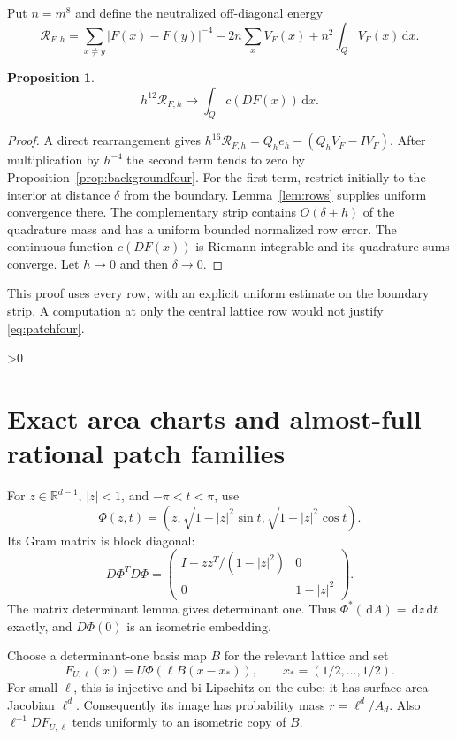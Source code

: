 \documentclass[11pt,a4paper]{article}
\newtheorem{proposition}[theorem]{Proposition}
\theoremstyle{definition}
\newcommand{\R}{\mathbb R}
\newcommand{\dd}{\,\mathrm d}
\newcommand{\abs}[1]{\lvert#1\rvert}
\numberwithin{equation}{section}
\let\originalsection\section
\renewcommand{\section}{\ifnum\value{section}>0\clearpage\fi\originalsection}
\begin{document}
Put $n=m^8$ and define the neutralized off-diagonal energy
\begin{equation}
 \mathscr R_{F,h}=\sum_{x\ne y}\abs{F(x)-F(y)}^{-4}
                   -2n\sum_xV_F(x)+n^2\int_QV_F(x)\dd x.
\end{equation}
\begin{proposition}\label{prop:patchfour}
\begin{equation}\label{eq:patchfour}
 h^{12}\mathscr R_{F,h}\longrightarrow\int_Qc(DF(x))\dd x.
\end{equation}
\end{proposition}
\begin{proof}
A direct rearrangement gives
$h^{16}\mathscr R_{F,h}=Q_he_h-(Q_hV_F-IV_F)$.
After multiplication by $h^{-4}$ the second term tends to zero by Proposition~\ref{prop:backgroundfour}. For the first term, restrict initially to the interior at distance $\delta$ from the boundary. Lemma~\ref{lem:rows} supplies uniform convergence there. The complementary strip contains $O(\delta+h)$ of the quadrature mass and has a uniform bounded normalized row error. The continuous function $c(DF(x))$ is Riemann integrable and its quadrature sums converge. Let $h\to0$ and then $\delta\to0$.
\end{proof}
This proof uses every row, with an explicit uniform estimate on the boundary strip. A computation at only the central lattice row would not justify \eqref{eq:patchfour}.

\section{Exact area charts and almost-full rational patch families}\label{sec:charts}
For $z\in\R^{d-1}$, $\abs z<1$, and $-\pi<t<\pi$, use
\begin{equation}\label{eq:chart}
 \Phi(z,t)=(z,\sqrt{1-\abs z^2}\sin t,\sqrt{1-\abs z^2}\cos t).
\end{equation}
Its Gram matrix is block diagonal:
\begin{equation}
 D\Phi^TD\Phi=
 \begin{pmatrix}I+zz^T/(1-\abs z^2)&0\\0&1-\abs z^2\end{pmatrix}.
\end{equation}
The matrix determinant lemma gives determinant one. Thus $\Phi^*(\dd A)=\dd z\dd t$ exactly, and $D\Phi(0)$ is an isometric embedding.

Choose a determinant-one basis map $B$ for the relevant lattice and set
\begin{equation}
 F_{U,\ell}(x)=U\Phi(\ell B(x-x_*)),\qquad x_*=(1/2,\ldots,1/2).
\end{equation}
For small $\ell$, this is injective and bi-Lipschitz on the cube; it has surface-area Jacobian $\ell^d$. Consequently its image has probability mass $r=\ell^d/A_d$. Also $\ell^{-1}DF_{U,\ell}$ tends uniformly to an isometric copy of $B$.
\end{document}
